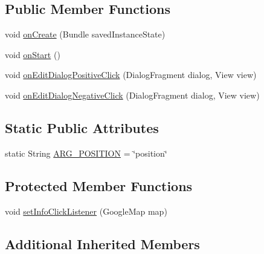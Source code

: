 \subsection*{Public Member Functions}
\begin{DoxyCompactItemize}
\item 
void \hyperlink{classuk_1_1ac_1_1swan_1_1digitaltrails_1_1fragments_1_1_add_waypoint_map_fragment_a962cf9a96da959078697e6c5c4298d67}{on\+Create} (Bundle saved\+Instance\+State)
\item 
void \hyperlink{classuk_1_1ac_1_1swan_1_1digitaltrails_1_1fragments_1_1_add_waypoint_map_fragment_aac9af58bd96b52b532c614987267a07f}{on\+Start} ()
\item 
void \hyperlink{classuk_1_1ac_1_1swan_1_1digitaltrails_1_1fragments_1_1_add_waypoint_map_fragment_a510b75748b076b65fa40024960699386}{on\+Edit\+Dialog\+Positive\+Click} (Dialog\+Fragment dialog, View view)
\item 
void \hyperlink{classuk_1_1ac_1_1swan_1_1digitaltrails_1_1fragments_1_1_add_waypoint_map_fragment_ab8063bca912b6a3172052733064a5749}{on\+Edit\+Dialog\+Negative\+Click} (Dialog\+Fragment dialog, View view)
\end{DoxyCompactItemize}
\subsection*{Static Public Attributes}
\begin{DoxyCompactItemize}
\item 
static String \hyperlink{classuk_1_1ac_1_1swan_1_1digitaltrails_1_1fragments_1_1_add_waypoint_map_fragment_a1546ba6c384f1a7d77c5146d42368d0a}{A\+R\+G\+\_\+\+P\+O\+S\+I\+T\+I\+O\+N} = \char`\"{}position\char`\"{}
\end{DoxyCompactItemize}
\subsection*{Protected Member Functions}
\begin{DoxyCompactItemize}
\item 
void \hyperlink{classuk_1_1ac_1_1swan_1_1digitaltrails_1_1fragments_1_1_add_waypoint_map_fragment_a140a606e633bd54be66aa0e554ec0f95}{set\+Info\+Click\+Listener} (Google\+Map map)
\end{DoxyCompactItemize}
\subsection*{Additional Inherited Members}


